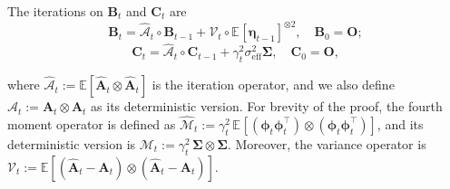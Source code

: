 \documentclass{article}
\theoremstyle{definition}
\theoremstyle{definition}
\theoremstyle{plain}
\theoremstyle{plain}
\theoremstyle{plain}
\newtheorem{lemma}{Lemma}
\theoremstyle{plain}
\theoremstyle{plain}
\newcommand{\bs}[1]{\boldsymbol{\mathbf{#1}}}
\newcommand{\mc}[1]{{\mathcal{#1}}}
\newcommand{\Ex}{\mathbb{E}}
\newcommand{\vecx}{\mathbf{x}}
\newcommand{\eff}{\mathrm{eff}}
\newcommand{\Sig}{\mathbf{\Sigma}}
\newcommand{\w}{\mathbf{w}}
\newcommand{\id}{\mathbf{I}}
\newcommand{\bias}{\mathrm{bias}}
\newcommand{\var}{\mathrm{var}}
\newcommand{\ex}[2][]{\mathbb{E}_{#1}\left[ #2 \right]}
\newcommand{\nm}[2][]{\left\| #2 \right\|^2_{#1}}
\begin{document}
The iterations on $\bs B_t$ and $\bs C_t$ are
\begin{equation}
    \bs B_t = \widehat{\mc{A}}_t\circ\bs B_{t-1} + \mathcal{V}_t\circ \ex{\bs \eta_{t-1}}^{\otimes2},\quad \bs B_0 = \bs O;
\end{equation}
\begin{equation}
\label{eq:variance_recursion}
    \bs C_t = \widehat{\mc A}_t\circ \bs C_{t-1} + \gamma_t^2{\sigma}_\eff^2\bs\Sigma,\quad \bs C_0 = \bs O,
\end{equation}

where $\widehat{\mc A}_t := \Ex[\bs{\widehat A}_t\otimes \bs{\widehat A}_t]$ is the iteration operator, and we also define $\mc A_t := \bs A_t\otimes \bs A_t$ as its deterministic version. For brevity of the proof, the fourth moment operator is defined as $\widehat{\mc M}_t := \gamma_t^2\,\ex{(\bs\phi_t\bs\phi_t^\top)\otimes(\bs\phi_t\bs\phi_t^\top)}$, and its deterministic version is $\mc M_t :=\gamma_t^2\,\bs \Sigma\otimes \bs \Sigma $. Moreover, the variance operator is $\mathcal{V}_t := \mathbb{E}[(\bs{\widehat A}_t - \bs A_t) \otimes (\bs{\widehat A}_t - \bs A_t)]$.


\end{document}
